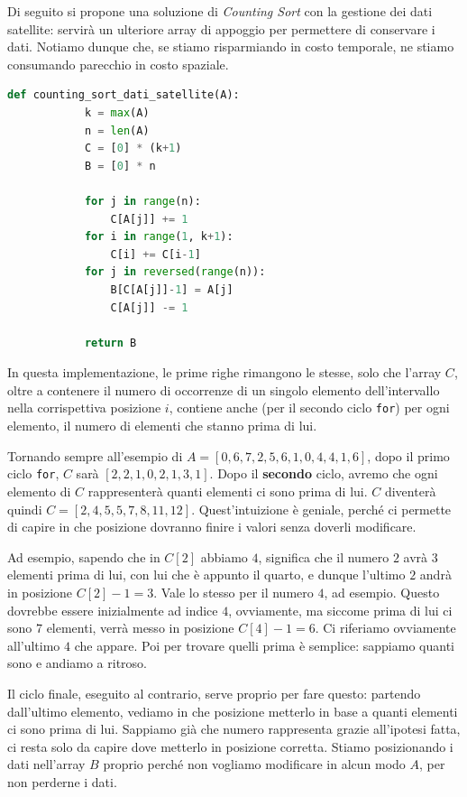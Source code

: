 \documentclass[12pt]{report}
\begin{document}
    Di seguito si propone una soluzione di \textit{Counting Sort} con la gestione dei dati satellite: servirà un ulteriore array di appoggio per permettere di conservare i dati. Notiamo dunque che, se stiamo risparmiando in costo temporale, ne stiamo consumando parecchio in costo spaziale.
    
    \begin{lstlisting}[language=Python, caption={Codice del Counting Sort con salvataggio dei dati satellite}]
    	def counting_sort_dati_satellite(A):
    		k = max(A)
    		n = len(A)
    		C = [0] * (k+1)
    		B = [0] * n
    		
    		for j in range(n):
    			C[A[j]] += 1
    		for i in range(1, k+1):
    			C[i] += C[i-1]
    		for j in reversed(range(n)):
    			B[C[A[j]]-1] = A[j]
    			C[A[j]] -= 1
    			
    		return B
    \end{lstlisting}
    
    In questa implementazione, le prime righe rimangono le stesse, solo che l'array $C$, oltre a contenere il numero di occorrenze di un singolo elemento dell'intervallo nella corrispettiva posizione $i$, contiene anche (per il secondo ciclo \texttt{for}) per ogni elemento, il numero di elementi che stanno prima di lui. 
    
    Tornando sempre all'esempio di $A = [0, 6, 7, 2, 5, 6, 1, 0, 4, 4, 1, 6]$, dopo il primo ciclo \texttt{for}, $C$ sarà $[2, 2, 1, 0, 2, 1, 3, 1]$. Dopo il \textbf{secondo} ciclo, avremo che ogni elemento di $C$ rappresenterà quanti elementi ci sono prima di lui. $C$ diventerà quindi $C = [2, 4, 5, 5, 7, 8, 11, 12]$. Quest'intuizione è geniale, perché ci permette di capire in che posizione dovranno finire i valori senza doverli modificare. 
    
    Ad esempio, sapendo che in $C[2]$ abbiamo $4$, significa che il numero $2$ avrà $3$ elementi prima di lui, con lui che è appunto il quarto, e dunque l'ultimo $2$ andrà in posizione $C[2]-1 = 3$. Vale lo stesso per il numero $4$, ad esempio. Questo dovrebbe essere inizialmente ad indice $4$, ovviamente, ma siccome prima di lui ci sono $7$ elementi, verrà messo in posizione $C[4]-1 = 6$. Ci riferiamo ovviamente all'ultimo $4$ che appare. Poi per trovare quelli prima è semplice: sappiamo quanti sono e andiamo a ritroso.
    
    Il ciclo finale, eseguito al contrario, serve proprio per fare questo: partendo dall'ultimo elemento, vediamo in che posizione metterlo in base a quanti elementi ci sono prima di lui. Sappiamo già che numero rappresenta grazie all'ipotesi fatta, ci resta solo da capire dove metterlo in posizione corretta. Stiamo posizionando i dati nell'array $B$ proprio perché non vogliamo modificare in alcun modo $A$, per non perderne i dati.
    
\end{document}
